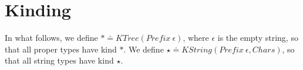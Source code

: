 \documentclass{article}
\begin{document}

\section*{Kinding}

In what follows, we define $\ast \doteq \mathit{KTree}(\mathit{Prefix}~\epsilon)$, where $\epsilon$ is the empty string, so that all proper types have kind $\ast$. We define $\star \doteq \mathit{KString}(\mathit{Prefix}~\epsilon, \mathit{Chars})$, so that all string types have kind $\star$.
\end{document}
